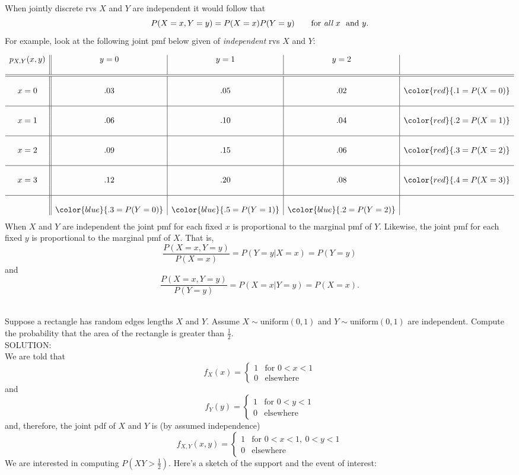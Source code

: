 \documentclass[12pt]{article}
\begin{document}
\newpage


\\
When jointly discrete rvs $X$ and $Y$ are independent it would follow that
$$P(X=x,Y=y)=P(X=x)P(Y=y)\qquad \mbox{for {\em all} } x\ \ \mbox{and  }y.$$
For example, look at the following joint pmf below given of {\em independent} rvs $X$ and $Y$:

$$\begin{array}{c||c|c|c|c} p_{X,Y}(x,y)  & y=0 & y=1 & y=2 & \quad \\
& & & &\\ \hline\hline
& & & &\\
x=0 & .03 & .05 & .02 & \color{red}{.1=P(X=0)}\\
& & & &\\ \hline
& & & &\\
x=1 & .06 & .10 & .04 & \color{red}{.2=P(X=1)}\\
& & & &\\ \hline
& & & &\\
x=2 & .09 & .15 & .06 & \color{red}{.3=P(X=2)}\\
& & & &\\ \hline
& & & &\\
x=3 & .12 & .20 & .08 & \color{red}{.4=P(X=3)}\\
& & & &\\ \hline
& & & &\\
& \color{blue}{.3=P(Y=0)} & \color{blue}{.5=P(Y=1)} & \color{blue}{.2=P(Y=2)} \end{array}$$
When $X$ and $Y$ are independent the joint pmf for each fixed $x$ is proportional to the marginal pmf of $Y$.
Likewise, the joint pmf for each fixed $y$ is proportional to the marginal pmf of $X$. That is,
$$\frac {P(X=x,Y=y)}{P(X=x)} = P(Y=y|X=x)=P(Y=y)$$
and
$$\frac {P(X=x,Y=y)}{P(Y=y)} = P(X=x|Y=y)=P(X=x).$$


\newpage


\\
Suppose a rectangle has random edges lengths $X$ and $Y$. Assume $X\sim \mbox{uniform}(0,1)$ and $Y\sim \mbox{uniform}(0,1)$ are
independent. Compute the probability that the area of the rectangle is greater than $\frac 12$.\\

\noindent SOLUTION:\\
We are told that
$$f_X(x) = \left\{ \begin{array}{cl}  1 & \mbox{for }0<x<1 \\ 0 & \mbox{elsewhere}  \end{array}\right.$$
and
$$f_Y(y) = \left\{ \begin{array}{cl}  1 & \mbox{for }0<y<1 \\ 0 & \mbox{elsewhere}  \end{array}\right.$$
and, therefore, the joint pdf of $X$ and $Y$ is (by assumed independence)
$$f_{X,Y}(x,y) = \left\{ \begin{array}{cl}  1 & \mbox{for }0<x<1, \ 0<y<1 \\ 0 & \mbox{elsewhere}  \end{array}\right.$$
We are interested in computing $P(XY>\frac 12)$.  Here's a sketch of the support and the event of interest:
\end{document}
